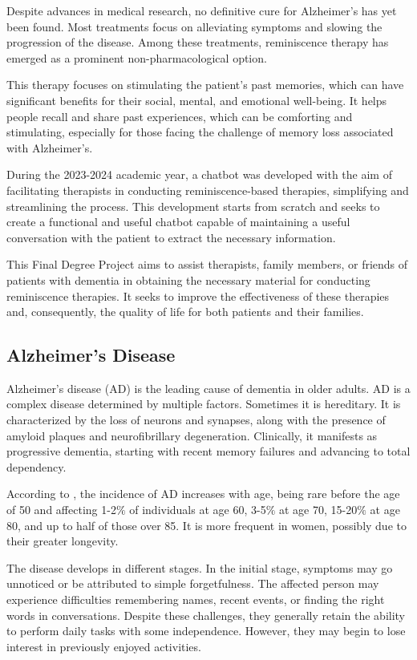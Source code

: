 Despite advances in medical research, no definitive cure for Alzheimer's has yet been found. Most treatments focus on alleviating symptoms and slowing the progression of the disease. Among these treatments, reminiscence therapy has emerged as a prominent non-pharmacological option.

This therapy focuses on stimulating the patient's past memories, which can have significant benefits for their social, mental, and emotional well-being. It helps people recall and share past experiences, which can be comforting and stimulating, especially for those facing the challenge of memory loss associated with Alzheimer's.

During the 2023-2024 academic year, a chatbot was developed with the aim of facilitating therapists in conducting reminiscence-based therapies, simplifying and streamlining the process. This development starts from scratch and seeks to create a functional and useful chatbot capable of maintaining a useful conversation with the patient to extract the necessary information.

This Final Degree Project aims to assist therapists, family members, or friends of patients with dementia in obtaining the necessary material for conducting reminiscence therapies. It seeks to improve the effectiveness of these therapies and, consequently, the quality of life for both patients and their families.

\subsection{Alzheimer's Disease}
Alzheimer's disease (AD) is the leading cause of dementia in older adults. AD is a complex disease determined by multiple factors. Sometimes it is hereditary. It is characterized by the loss of neurons and synapses, along with the presence of amyloid plaques and neurofibrillary degeneration. Clinically, it manifests as progressive dementia, starting with recent memory failures and advancing to total dependency.

According to \cite{Donoso2003}, the incidence of AD increases with age, being rare before the age of 50 and affecting 1-2$\%$ of individuals at age 60, 3-5$\%$ at age 70, 15-20$\%$ at age 80, and up to half of those over 85. It is more frequent in women, possibly due to their greater longevity.

The disease develops in different stages. In the initial stage, symptoms may go unnoticed or be attributed to simple forgetfulness. The affected person may experience difficulties remembering names, recent events, or finding the right words in conversations. Despite these challenges, they generally retain the ability to perform daily tasks with some independence. However, they may begin to lose interest in previously enjoyed activities.

